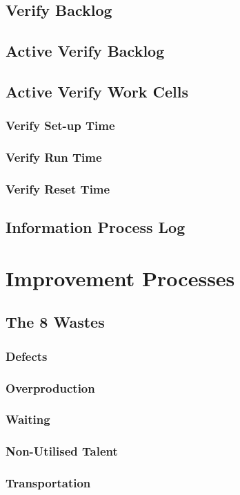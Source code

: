 \documentclass{acm_proc_article-sp}
\begin{document}
\subsection{Verify Backlog}
\subsection{Active Verify Backlog}
\subsection{Active Verify Work Cells}
\subsubsection{Verify Set-up Time}
\subsubsection{Verify Run Time}
\subsubsection{Verify Reset Time}
\subsection{Information Process Log}
\newpage
\section{Improvement Processes}
\subsection{The 8 Wastes}
\subsubsection{Defects}
\subsubsection{Overproduction}
\subsubsection{Waiting}
\subsubsection{Non-Utilised Talent}
\subsubsection{Transportation}
\end{document}
